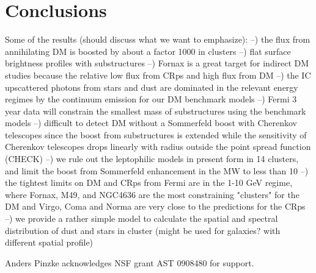 \documentclass[10pt,aps,pra,reprint,amsmath,amsfonts,amssymb,showpacs]{revtex4-1}
\begin{document}
%


\section{Conclusions}

Some of the results (should discuss what we want to emphasize):
--) the flux from annihilating DM is boosted by about a factor 1000 in
 clusters
--) flat surface brightness profiles with substructures
--) Fornax is a great target for indirect DM studies because the relative
 low flux from CRps and high flux from DM
--) the IC upscattered photons from stars and dust are dominated in the
 relevant energy regimes by the continuum emission for our DM
 benchmark models
--) Fermi 3 year data will constrain the smallest mass of substructures
 using the benchmark models
--) difficult to detect DM without a Sommerfeld boost with Cherenkov
 telescopes since the boost from substructures is extended while the
 sensitivity of Cherenkov telescopes drops linearly with radius
 outside the point spread function (CHECK)
--) we rule out the leptophilic models in present form in 14 clusters,
 and limit the boost from Sommerfeld enhancement in the MW to less
 than 10
--) the tightest limits on DM and CRps from Fermi are in the 1-10 GeV
 regime, where Fornax, M49, and NGC4636 are the most constraining
 "clusters" for the DM and Virgo, Coma and Norma are very close to the
 predictions for the CRps
--) we provide a rather simple model to calculate the spatial and spectral
 distribution of dust and stars in cluster (might be used for
 galaxies? with different spatial profile)




\smallskip
Anders Pinzke acknowledges NSF grant AST 0908480 for support.


%


\vspace{-0.7cm}

%
%
\end{document}
